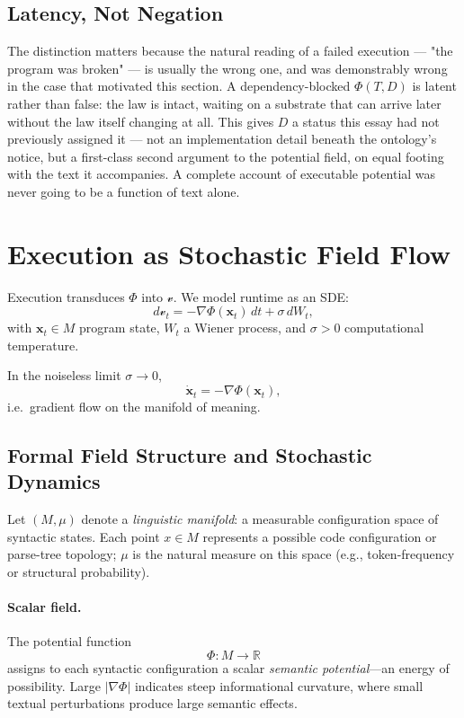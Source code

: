 \documentclass[12pt,a4paper]{article}
\theoremstyle{plain}
\theoremstyle{definition}
\theoremstyle{remark}
\newcommand{\Phifield}{\Phi}
\newcommand{\vfield}{\mathcal{v}}
\begin{document}
\subsection{Latency, Not Negation}
\label{subsec:latency-not-negation}

The distinction matters because the natural reading of a failed execution — "the program was broken" — is usually the wrong one, and was demonstrably wrong in the case that motivated this section. A dependency-blocked $\Phifield(T,D)$ is latent rather than false: the law is intact, waiting on a substrate that can arrive later without the law itself changing at all. This gives $D$ a status this essay had not previously assigned it — not an implementation detail beneath the ontology's notice, but a first-class second argument to the potential field, on equal footing with the text it accompanies. A complete account of executable potential was never going to be a function of text alone.

\section{Execution as Stochastic Field Flow}
\label{sec:field-flow}

Execution transduces $\Phifield$ into $\vfield$. We model runtime as an SDE:
\begin{equation}
d\vfield_t = - \nabla \Phifield(\mathbf{x}_t)\,dt + \sigma\, dW_t,
\label{eq:execution-sde}
\end{equation}
with $\mathbf{x}_t\!\in\!M$ program state, $W_t$ a Wiener process, and $\sigma>0$ computational temperature.

In the noiseless limit $\sigma\to 0$,
\[
\dot{\mathbf{x}}_t = - \nabla \Phifield(\mathbf{x}_t),
\]
i.e.\ gradient flow on the manifold of meaning.

\subsection{Formal Field Structure and Stochastic Dynamics}
\label{subsec:formalfields}

Let $(M,\mu)$ denote a \emph{linguistic manifold}: a measurable configuration space of syntactic states. Each point $x\in M$ represents a possible code configuration or parse-tree topology; $\mu$ is the natural measure on this space (e.g., token-frequency or structural probability).

\paragraph{Scalar field.}
The potential function
\[
\Phifield : M \longrightarrow \mathbb{R}
\]
assigns to each syntactic configuration a scalar \emph{semantic potential}---an energy of possibility. Large $|\nabla\Phifield|$ indicates steep informational curvature, where small textual perturbations produce large semantic effects.
\end{document}
